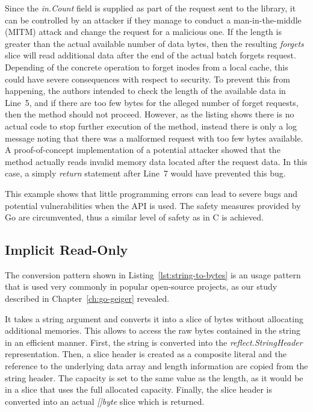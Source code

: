 Since the \textit{in.Count} field is supplied as part of the request sent to the library, it can be controlled by an
attacker if they manage to conduct a man-in-the-middle (\acrshort{MITM}) attack and change the request for a malicious
one.
If the length is greater than the actual available number of data bytes, then the resulting \textit{forgets} slice will
read additional data after the end of the actual batch forgets request.
Depending of the concrete operation to forget inodes from a local cache, this could have severe consequences with
respect to security.
To prevent this from happening, the authors intended to check the length of the available data in Line~5, and if there
are too few bytes for the alleged number of forget requests, then the method should not proceed.
However, as the listing shows there is no actual code to stop further execution of the method, instead there is only a
log message noting that there was a malformed request with too few bytes available.
A proof-of-concept implementation of a potential attacker showed that the method actually reads invalid memory data
located after the request data.
In this case, a simply \textit{return} statement after Line~7 would have prevented this bug.

This example shows that little programming errors can lead to severe bugs and potential vulnerabilities when the
\unsafe{} \acrshort{API} is used.
The safety measures provided by Go are circumvented, thus a similar level of safety as in C is achieved.



\subsection{Implicit Read-Only}\label{subsec:unsafe-security-problems:slice-casts:read-only}

The conversion pattern shown in Listing~\ref{lst:string-to-bytes} is an \unsafe{} usage pattern that is used very
commonly in popular open-source projects, as our study described in Chapter~\ref{ch:go-geiger} revealed.



It takes a string argument and converts it into a slice of bytes without allocating additional memories.
This allows to access the raw bytes contained in the string in an efficient manner.
First, the string is converted into the \textit{reflect.StringHeader} representation.
Then, a slice header is created as a composite literal and the reference to the underlying data array and length
information are copied from the string header.
The capacity is set to the same value as the length, as it would be in a slice that uses the full allocated capacity.
Finally, the slice header is converted into an actual \textit{[]byte} slice which is returned.

